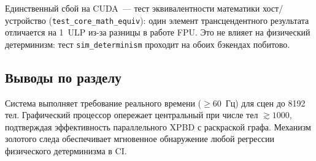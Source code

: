 Единственный сбой на CUDA~--- тест эквивалентности математики хост/\allowbreak устройство 
(\texttt{test\_core\_math\_equiv}): один элемент трансцендентного результата отличается на 1~ULP из-за разницы 
в работе FPU. Это не влияет на физический детерминизм: тест \texttt{sim\_determinism} проходит на обоих 
бэкендах побитово.

\subsection{Выводы по разделу}

Система выполняет требование реального времени ($\geq 60$~Гц) для сцен до 8192 тел. Графический процессор опережает центральный при 
числе тел $\gtrsim 1000$, подтверждая эффективность параллельного XPBD с раскраской графа. Механизм золотого 
следа обеспечивает мгновенное обнаружение любой регрессии физического детерминизма в CI.
